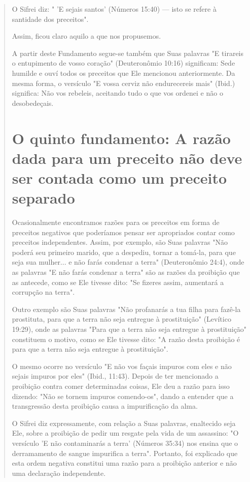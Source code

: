 \begin{quote}
O Sifrei diz: " 'E sejais santos' (Números 15:40) --- isto se refere à
santidade dos preceitos".

Assim, ficou claro aquilo a que nos propusemos.

A partir deste Fundamento segue-se também que Suas palavras "E tirareis
o entupimento de vosso coração" (Deuteronômio 10:16) significam: Sede
humilde e ouví todos os preceitos que Ele mencionou anteriormente. Da
mes­ma forma, o versículo "E vossa cerviz não endurecereis mais" (Ibid.)
significa: Não vos rebeleis, aceitando tudo o que vos ordenei e não o
desobedeçais.

\chapter{O quinto fundamento: A razão dada para um 
preceito não deve ser contada como um preceito separado}

Ocasionalmente encontramos razões para os preceitos em forma de
preceitos negativos que poderíamos pensar ser apropriados contar como
pre­ceitos independentes. Assim, por exemplo, são Suas palavras "Não
poderá seu primeiro marido, que a despediu, tornar a tomá-la, para que
seja sua mulher... e não farás condenar a terra" (Deuteronômio 24:4),
onde as palavras "E não farás condenar a terra" são as razões da
proibição que as antecede, como se Ele tivesse dito: "Se fizeres assim,
aumentará a corrupção na terra".

Outro exemplo são Suas palavras "Não profanarás a tua filha para fazê-la
prostituta, para que a terra não seja entregue à prostituição" (Levítico
19:29), onde as palavras "Para que a terra não seja entregue à
prostituição" cons­tituem o motivo, como se Ele tivesse dito: "A razão
desta proibição é para que a terra não seja entregue à prostituição".

O mesmo ocorre no versículo "E não vos façais impuros com eles e não
sejais impuros por eles" (Ibid., 11:43). Depois de ter mencionado a
proibição contra comer determinadas coisas, Ele deu a razão para isso
dizendo: "Não se tornem impuros comendo-os", dando a entender que a
transgressão desta proibição causa a impurificação da alma.

O Sifrei diz expressamente, com relação a Suas palavras, enaltecido seja
Ele, sobre a proibição de pedir um resgate pela vida de um assassino: "O
versículo 'E não contaminarás a terra' (Números 35:34) nos ensina que o
derra­mamento de sangue impurifica a terra". Portanto, foi explicado que
esta or­dem negativa constitui uma razão para a proibição anterior e não
uma declara­ção independente.
\end{quote}

